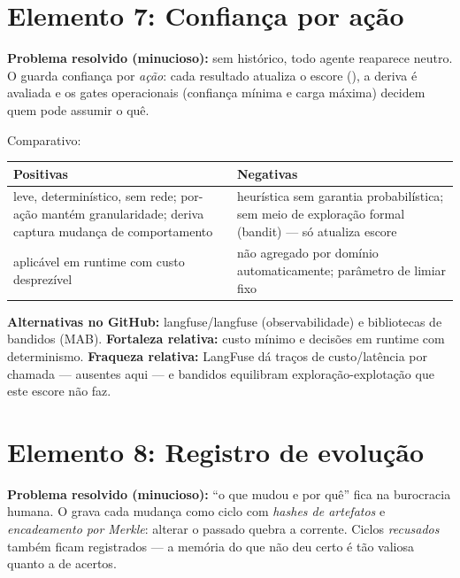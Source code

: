 \clearpage
\section{Elemento 7: Confiança por ação}


\begin{funcao}
\textbf{Problema resolvido (minucioso):} sem histórico, todo agente reaparece
neutro. O  guarda confiança por \emph{ação}: cada resultado
atualiza o escore (), a deriva é avaliada e os gates
operacionais (confiança mínima e carga máxima) decidem quem pode assumir o quê.
\end{funcao}

\begin{resultado}
Comparativo:\par
\smallskip
{\footnotesize
\begin{tabularx}{\linewidth}{YY}
\toprule
Positivas & Negativas \\
\midrule
leve, determinístico, sem rede; por-ação mantém granularidade; deriva captura
mudança de comportamento & heurística sem garantia probabilística; sem meio de
exploração formal (bandit) — só atualiza escore \\
aplicável em runtime com custo desprezível & não agregado por domínio
automaticamente; parâmetro de limiar fixo \\
\bottomrule
\end{tabularx}\par}
\end{resultado}

\begin{metodo}
\textbf{Alternativas no GitHub:} langfuse/langfuse (observabilidade) e
bibliotecas de bandidos (MAB). \textbf{Fortaleza relativa:} custo mínimo e
decisões em runtime com determinismo. \textbf{Fraqueza relativa:} LangFuse dá
traços de custo/latência por chamada — ausentes aqui — e bandidos equilibram
exploração-explotação que este escore não faz.
\end{metodo}

\clearpage
\section{Elemento 8: Registro de evolução}


\begin{funcao}
\textbf{Problema resolvido (minucioso):} ``o que mudou e por quê'' fica na
burocracia humana. O  grava cada mudança como ciclo com
\emph{hashes de artefatos} e \emph{encadeamento por Merkle}: alterar o passado
quebra a corrente. Ciclos \emph{recusados} também ficam registrados — a memória
do que não deu certo é tão valiosa quanto a de acertos.
\end{funcao}

